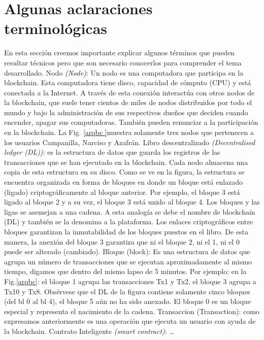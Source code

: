 \documentclass[12pt]{report} %
\begin{document}
\section{Algunas aclaraciones terminológicas}

	En esta sección creemos importante explicar algunos términos que pueden resultar técnicos pero que son necesario conocerlos para comprender el tema desarrollado.
	Nodo \textit{(Node)}: Un nodo es una computadora que participa en la blockchain. Esta computadora tiene disco, capacidad de cómputo (CPU) y está conectada a la Internet. A través de esta conexión interactúa con otros nodos de la blockchain, que suele tener cientos de miles de nodos distribuidos por todo el mundo y bajo la administración de sus respectivos dueños que deciden cuando encender, apagar sus computadoras. También pueden renunciar a la participación en la blockchain. La Fig. \ref{arqbc }muestra solamente tres nodos que pertenecen a los usuarios Campanilla, Narciso y Azafrán.
	Libro descentralizado \textit{(Decentralised ledger (DL))}:  es la estructura de datos que guarda los registros de las transacciones que se han ejecutado en la blockchain. Cada nodo almacena una copia de esta estructura en su disco. Como se ve en la figura, la estructura se encuentra organizada en forma de bloques en donde un bloque está enlazado (ligado) criptográficamente al bloque anterior. Por ejemplo, el bloque 3 está ligado al bloque 2 y a su vez, el bloque 3 está unido al bloque 4. Los bloques y las ligas se asemejan a una cadena. A esta analogía se debe el nombre de blockchain (DL) y también se la denomina a la plataforma.
	Los enlaces criptográficos entre bloques garantizan la inmutabilidad de los bloques puestos en el libro. De esta manera, la anexión del bloque 3 garantiza que ni el bloque 2, ni el 1, ni el 0 puede ser alterado (cambiado).
	Bloque (block): Es una estructura de datos que agrupa un número de transacciones que se ejecutan aproximadamente al mismo tiempo, digamos que dentro del mismo lapso de 5 minutos.
	Por ejemplo: en la Fig.\ref{arqbc}: el bloque 1 agrupa las transacciones Tx1 y Tx2, el bloque 3 agrupa a Tx10 y Tx8.
	Obsérvese que el DL de la figura contiene solamente cinco bloques (del bl 0 al bl 4), el bloque 5 aún no ha sido anexado.  El bloque 0 es un bloque especial y representa el nacimiento de la cadena.
	Transaccion (Transaction):  como expresamos anteriormente es una operación que ejecuta un usuario con ayuda de la blockchain.
	Contrato Inteligente \textit{(smart contract)}: …
\end{document}
